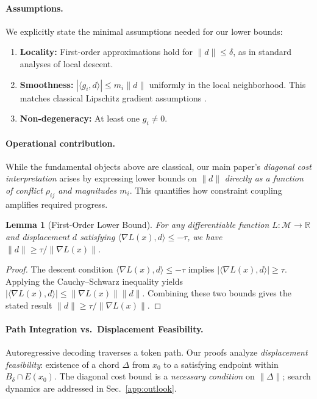 \documentclass{article}
\theoremstyle{plain}
\newtheorem{lemma}[theorem]{Lemma}
\theoremstyle{definition}
\theoremstyle{remark}
\newcommand{\secref}[1]{Sec.~\ref{#1}}
\begin{document}
\paragraph{Assumptions.}
We explicitly state the minimal assumptions needed for our lower bounds:
\begin{enumerate}
    \item \textbf{Locality:}
    First-order approximations hold for $\|d\|\le\delta$, as in standard analyses of local descent.
    \item \textbf{Smoothness:}
    $|\langle g_i, d \rangle| \le m_i \|d\|$ uniformly in the local neighborhood.
    This matches classical Lipschitz gradient assumptions
    \citep{boyd2004convex, nesterov2018lectures}.
    \item \textbf{Non-degeneracy:}
    At least one $g_i \neq 0$.
\end{enumerate}

\paragraph{Operational contribution.}
While the fundamental objects above are classical,
our main paper's \textit{diagonal cost interpretation} arises by expressing lower bounds
on $\|d\|$ \textit{directly as a function of conflict $\rho_{ij}$ and magnitudes $m_i$}.
This quantifies how constraint coupling amplifies required progress.

\begin{lemma}[First-Order Lower Bound]\label{lem:first_order}
For any differentiable function $L:\mathcal{M}\to\mathbb{R}$ and displacement $d$ satisfying $\langle \nabla L(x), d \rangle \le -\tau$, we have $\|d\| \ge \tau/\|\nabla L(x)\|$.
\end{lemma}

\begin{proof}
The descent condition $\langle \nabla L(x), d \rangle \le -\tau$ implies $|\langle \nabla L(x), d \rangle| \ge \tau$. Applying the Cauchy--Schwarz inequality yields $|\langle \nabla L(x), d \rangle| \le \|\nabla L(x)\| \|d\|$. Combining these two bounds gives the stated result $\|d\| \ge \tau / \|\nabla L(x)\|$.
\end{proof}

\paragraph{Path Integration vs.\ Displacement Feasibility.}
Autoregressive decoding traverses a token path. Our proofs analyze \emph{displacement feasibility}: existence of a chord $\Delta$ from $x_0$ to a satisfying endpoint within $B_\delta \cap E(x_0)$. The diagonal cost bound is a \emph{necessary condition} on $\|\Delta\|$; search dynamics are addressed in \secref{app:outlook}.
\end{document}
